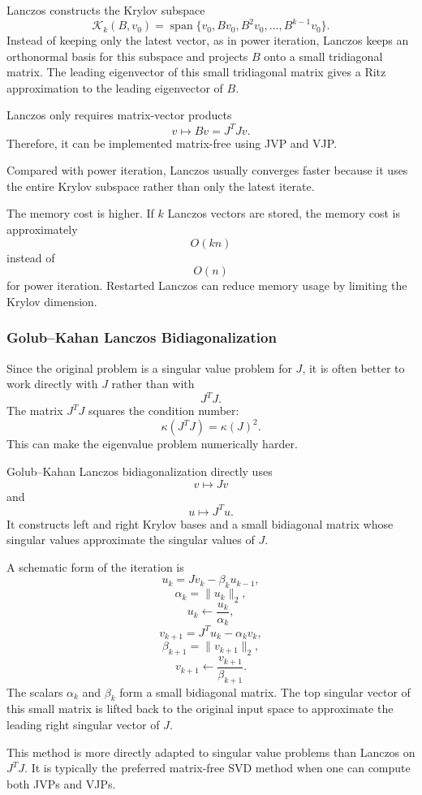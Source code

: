\documentclass{article}
\begin{document}
Lanczos constructs the Krylov subspace
\[
\mathcal{K}_k(B,v_0)
=
\operatorname{span}\{v_0,Bv_0,B^2v_0,\dots,B^{k-1}v_0\}.
\]
Instead of keeping only the latest vector, as in power iteration, Lanczos keeps an orthonormal basis for this subspace and projects \(B\) onto a small tridiagonal matrix. The leading eigenvector of this small tridiagonal matrix gives a Ritz approximation to the leading eigenvector of \(B\).

Lanczos only requires matrix-vector products
\[
v\mapsto Bv=J^TJv.
\]
Therefore, it can be implemented matrix-free using JVP and VJP.

Compared with power iteration, Lanczos usually converges faster because it uses the entire Krylov subspace rather than only the latest iterate.

The memory cost is higher. If \(k\) Lanczos vectors are stored, the memory cost is approximately
\[
O(kn)
\]
instead of
\[
O(n)
\]
for power iteration. Restarted Lanczos can reduce memory usage by limiting the Krylov dimension.

\subsubsection{Golub--Kahan Lanczos Bidiagonalization}

Since the original problem is a singular value problem for \(J\), it is often better to work directly with \(J\) rather than with
\[
J^TJ.
\]
The matrix \(J^TJ\) squares the condition number:
\[
\kappa(J^TJ)=\kappa(J)^2.
\]
This can make the eigenvalue problem numerically harder.

Golub--Kahan Lanczos bidiagonalization directly uses
\[
v\mapsto Jv
\]
and
\[
u\mapsto J^Tu.
\]
It constructs left and right Krylov bases and a small bidiagonal matrix whose singular values approximate the singular values of \(J\).

A schematic form of the iteration is
\[
u_k
=
Jv_k-\beta_k u_{k-1},
\]
\[
\alpha_k=\|u_k\|_2,
\]
\[
u_k\leftarrow \frac{u_k}{\alpha_k},
\]
\[
v_{k+1}
=
J^Tu_k-\alpha_k v_k,
\]
\[
\beta_{k+1}=\|v_{k+1}\|_2,
\]
\[
v_{k+1}\leftarrow \frac{v_{k+1}}{\beta_{k+1}}.
\]
The scalars \(\alpha_k\) and \(\beta_k\) form a small bidiagonal matrix. The top singular vector of this small matrix is lifted back to the original input space to approximate the leading right singular vector of \(J\).

This method is more directly adapted to singular value problems than Lanczos on \(J^TJ\). It is typically the preferred matrix-free SVD method when one can compute both JVPs and VJPs.
\end{document}
